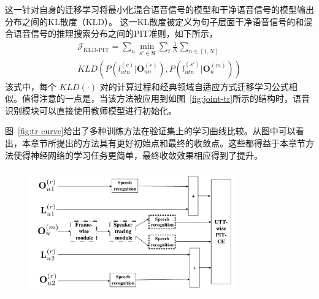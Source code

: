 这一针对自身的迁移学习将最小化混合语音信号的模型和干净语音信号的模型输出分布之间的KL散度（KLD）。
这一KL散度被定义为句子层面干净语音信号的和混合语音信号的推理搜索分布之间的PIT准则，如下所示，
\begin{equation}
\label{equ:kld-opt}
\begin{split}
\mathcal{J}_{\text{KLD-PIT}}=\sum_u \min_{s'\in \mathbf{S}} \sum_t \frac{1}{N} \sum_{n\in[1,N]} \\
KLD(P({l}_{utn}^{(c)}|\mathbf{O}_{un}^{(r)}),P({l}_{utn}^{(s')}|\mathbf{O}_{u}^{(m)}))
\end{split}
\end{equation}
该式中，每个 $KLD(\cdot)$ 对的计算过程和经典领域自适应方式迁移学习公式相似。值得注意的一点是，当该方法被应用到如图~\ref{fig:joint-tr}所示的结构时，语音识别模块可以直接使用教师模型进行初始化。

图~\ref{fig:tr-curve}给出了多种训练方法在验证集上的学习曲线比较。从图中可以看出，本章节所提出的方法具有更好初始点和最终的收敛点。这些都得益于本章节方法使得神经网络的学习任务更简单，最终收敛效果相应得到了提升。


\begin{figure}[!htp]
  \centering
    \captionstyle{\centering}
    \includegraphics[width=0.8\textwidth]{figure/joint-tr.pdf}
\end{figure}



